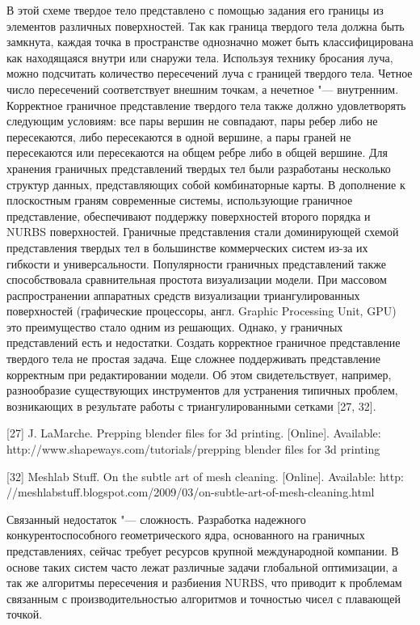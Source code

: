 В этой схеме твердое тело представлено с помощью задания его границы из элементов различных поверхностей. Так как граница твердого тела должна быть замкнута, каждая точка в пространстве однозначно может быть классифицирована как находящаяся внутри или снаружи тела. Используя технику бросания луча, можно подсчитать количество пересечений  луча с границей твердого тела. Четное число пересечений соответствует внешним точкам, а нечетное "--- внутренним. Корректное граничное представление твердого тела также должно удовлетворять следующим условиям: все пары вершин не совпадают, пары ребер либо не пересекаются, либо пересекаются в одной вершине, а пары граней не пересекаются или пересекаются на общем ребре либо в общей вершине. Для хранения граничных представлений твердых тел были разработаны несколько структур данных, представляющих собой комбинаторные карты. В дополнение к плоскостным граням современные системы, использующие граничное представление, обеспечивают поддержку поверхностей второго порядка и NURBS поверхностей. Граничные представления стали доминирующей схемой представления твердых тел в большинстве коммерческих систем из-за их гибкости и универсальности. Популярности граничных представлений также способствовала сравнительная простота визуализации модели. При массовом распространении аппаратных средств визуализации триангулированных поверхностей (графические процессоры, англ. Graphic Processing Unit, GPU) это преимущество стало одним из решающих. Однако, у граничных представлений есть и недостатки. Создать корректное граничное представление твердого тела не простая задача. Еще сложнее поддерживать представление корректным при редактировании модели. Об этом свидетельствует, например, разнообразие существующих инструментов для устранения типичных проблем, возникающих в результате работы с триангулированными сетками [27, 32].

[27] J. LaMarche. Prepping blender files for 3d printing. [Online]. Available:
http://www.shapeways.com/tutorials/prepping blender files for 3d printing

[32] Meshlab Stuff. On the subtle art of mesh cleaning. [Online]. Available: http:
//meshlabstuff.blogspot.com/2009/03/on-subtle-art-of-mesh-cleaning.html

Связанный недостаток "--- сложность. Разработка надежного конкурентоспособного геометрического ядра, основанного на граничных представлениях, сейчас требует ресурсов крупной международной компании. В основе таких систем часто лежат различные задачи глобальной оптимизации, а так же алгоритмы пересечения и разбиения NURBS, что приводит к проблемам связанным с производительностью алгоритмов и точностью чисел с плавающей точкой.


